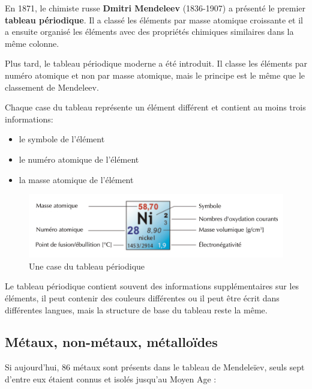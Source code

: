 \documentclass[
  11pt,
  a4paper,
  openany]{book}
\providecommand{\tightlist}{%
  \setlength{\itemsep}{0pt}\setlength{\parskip}{0pt}}
\begin{document}
En 1871, le chimiste russe \textbf{Dmitri Mendeleev} (1836-1907) a présenté le premier \textbf{tableau périodique}. Il a classé les éléments par masse atomique croissante et il a ensuite organisé les éléments avec des propriétés chimiques similaires dans la même colonne.

Plus tard, le tableau périodique moderne a été introduit. Il classe les éléments par numéro atomique et non par masse atomique, mais le principe est le même que le classement de Mendeleev.

\clearpage

Chaque case du tableau représente un élément différent et contient au moins trois informations:

\begin{itemize}
\tightlist
\item
  le symbole de l'élément
\item
  le numéro atomique de l'élément
\item
  la masse atomique de l'élément
\end{itemize}

\begin{figure}

{\centering \includegraphics[width=0.67\linewidth]{images/tpe-case} 

}

\caption{Une case du tableau périodique}\label{fig:tpe-case}
\end{figure}

Le tableau périodique contient souvent des informations supplémentaires sur les éléments, il peut contenir des couleurs différentes ou il peut être écrit dans différentes langues, mais la structure de base du tableau reste la même.

\hypertarget{muxe9taux-non-muxe9taux-muxe9tallouxefdes}{%
\subsection{Métaux, non-métaux, métalloïdes}\label{muxe9taux-non-muxe9taux-muxe9tallouxefdes}}

Si aujourd'hui, 86 métaux sont présents dans le tableau de Mendeleïev, seuls sept d'entre eux étaient connus et isolés jusqu'au Moyen Age :
\end{document}
